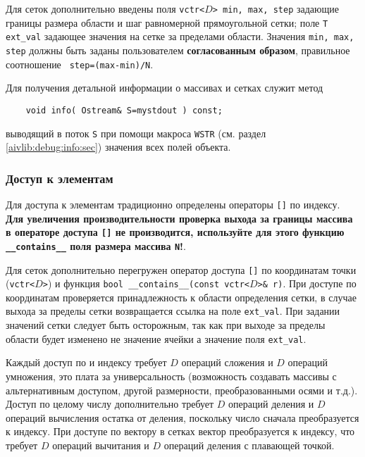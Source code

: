 Для сеток дополнительно введены поля {\tt vctr<$D$> min, max, step} задающие границы
размера области и шаг равномерной прямоугольной сетки; поле {\tt T ext\_val} задающее значения на сетке за
пределами области. Значения {\tt min, max, step} должны быть заданы
пользователем {\bf согласованным образом}, правильное соотношение {\tt
  step=(max-min)/N}.

Для получения детальной информации о массивах и сетках служит метод
\begin{verbatim}
    void info( Ostream& S=mystdout ) const;
\end{verbatim}
выводящий в поток {\tt S} при помощи макроса {\tt WSTR} (см. раздел
\ref{aivlib:debug:info:sec}) значения всех полей объекта.

\subsubsection{Доступ к элементам}
Для доступа к элементам традиционно определены операторы \verb'[]' по
индексу. {\bf
Для увеличения производительности проверка выхода за границы массива в
операторе доступа \verb'[]' не производится, используйте для этого функцию
{\tt \_\_contains\_\_} поля размера массива {\tt N}!}. 

Для сеток дополнительно перегружен оператор доступа \verb'[]' по координатам точки ({\tt vctr<$D$>}) и
функция {\tt bool~\_\_contains\_\_(const~vctr<$D$>\& r)}. При доступе по
координатам проверяется принадлежность к области определения сетки, в случае выхода за
пределы сетки возвращается ссылка на поле {\tt ext\_val}. При задании значений сетки
следует быть осторожным, так как при выходе
за пределы области будет изменено не значение ячейки а значение поля {\tt ext\_val}.

Каждый доступ по и индексу требует $D$ операций сложения и $D$ операций
умножения, это плата за универсальность (возможность создавать массивы с
альтернативным доступом, другой размерности, преобразованными осями и
т.д.). Доступ по целому числу дополнительно требует $D$ операций деления и $D$
операций вычисления остатка от деления, поскольку число сначала преобразуется
к индексу. При доступе по вектору в сетках вектор преобразуется к индексу, что
требует $D$ операций вычитания и $D$ операций деления с плавающей точкой. 

